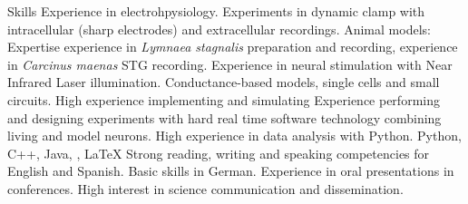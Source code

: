 \begin{rubric}{Skills}
	Experience in electrohpysiology. Experiments in dynamic clamp with intracellular (sharp electrodes) and extracellular recordings. Animal models: Expertise experience in \textit{Lymnaea stagnalis} preparation and recording, experience in \textit{Carcinus maenas} STG recording.
    Experience in neural stimulation with Near Infrared Laser illumination.
    \large{Conductance-based models}, single cells and small circuits. High experience implementing and simulating 
 Experience performing and designing experiments with hard real time software technology combining living and model neurons. 
    High experience in data analysis with \large{Python}. 
	Python, C++, Java, , \LaTeX
{}
	Strong reading, writing and speaking competencies for English and Spanish. Basic skills in German.
 \large{Experience in oral presentations in conferences}. High interest in science communication and dissemination.

\end{rubric}
